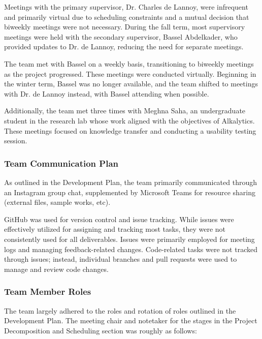 \documentclass{article}
\begin{document}
Meetings with the primary supervisor, Dr. Charles de Lannoy, were infrequent and
primarily virtual due to scheduling constraints and a mutual decision that
biweekly meetings were not necessary. During the fall term, most supervisory
meetings were held with the secondary supervisor, Bassel Abdelkader, who
provided updates to Dr. de Lannoy, reducing the need for separate meetings.

The team met with Bassel on a weekly basis, transitioning to biweekly meetings
as the project progressed. These meetings were conducted virtually. Beginning in
the winter term, Bassel was no longer available, and the team shifted to
meetings with Dr. de Lannoy instead, with Bassel attending when possible.

Additionally, the team met three times with Meghna Saha, an undergraduate
student in the research lab whose work aligned with the objectives of
Alkalytics. These meetings focused on knowledge transfer and conducting a
usability testing session.

\subsubsection{Team Communication Plan}
As outlined in the Development Plan, the team primarily communicated through an
Instagram group chat, supplemented by Microsoft Teams for resource sharing
(external files, sample works, etc).

GitHub was used for version control and issue tracking. While issues were
effectively utilized for assigning and tracking most tasks, they were not
consistently used for all deliverables. Issues were primarily employed for
meeting logs and managing feedback-related changes. Code-related tasks were not
tracked through issues; instead, individual branches and pull requests were used
to manage and review code changes.


\subsubsection{Team Member Roles}
The team largely adhered to the roles and rotation of roles outlined in the
Development Plan. The meeting chair and notetaker for the stages in the Project
Decomposition and Scheduling section was roughly as follows:
\end{document}
